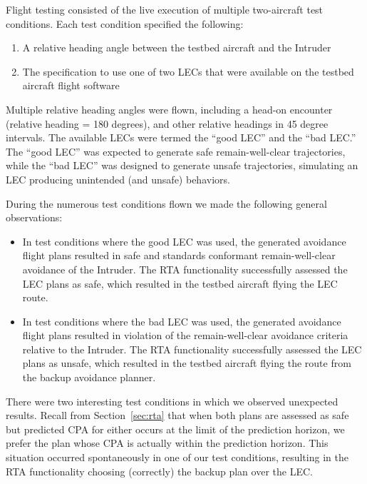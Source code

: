 Flight testing consisted of the live execution of multiple two-aircraft test conditions.  Each test condition specified the following:
\begin{enumerate}
\item A relative heading angle between the testbed aircraft and the Intruder
\item The specification to use one of two LECs that were available on the testbed aircraft flight software
\end{enumerate}

Multiple relative heading angles were flown, including a head-on encounter (relative heading = 180 degrees), and other relative headings in 45 degree intervals.
The available LECs were termed the ``good LEC'' and the ``bad LEC.''  The ``good LEC'' was expected to generate safe remain-well-clear trajectories, while the ``bad LEC'' was designed to generate unsafe trajectories, simulating an LEC producing unintended (and unsafe) behaviors.  

During the numerous test conditions flown we made the following general observations:
\begin{itemize}
\item In test conditions where the good LEC was used, the generated avoidance flight plans resulted in safe and standards conformant remain-well-clear avoidance of the Intruder.  The RTA functionality successfully assessed the LEC plans as safe, which resulted in the testbed aircraft flying the LEC route.  
\item In test conditions where the bad LEC was used, the generated avoidance flight plans resulted in violation of the remain-well-clear avoidance criteria relative to the Intruder.  The RTA functionality successfully assessed the LEC plans as unsafe, which resulted in the testbed aircraft flying the route from the backup avoidance planner.  
\end{itemize}


There were two interesting test conditions in which we observed unexpected results.  Recall from Section~\ref{sec:rta} that when both plans are assessed as safe but predicted CPA for either occurs at the limit of the prediction horizon, we prefer the plan whose CPA is actually within the prediction horizon.  This situation occurred spontaneously in one of our test conditions, resulting in the RTA functionality choosing (correctly) the backup plan over the LEC.  

